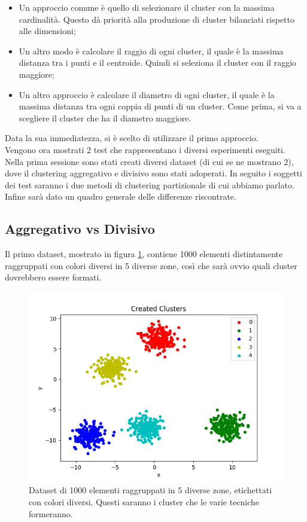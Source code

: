 \documentclass{llncs}
\newcommand{\acapo}{\vspace{0.5\baselineskip}\\}
\begin{document}
	\begin{itemize}
		\item Un approccio comune è quello di selezionare il cluster con la massima cardinalità. Questo dà priorità alla produzione di cluster bilanciati rispetto alle dimensioni;
	
		\item Un altro modo è calcolare il raggio di ogni cluster, il quale è la massima distanza tra i punti e il centroide. Quindi si seleziona il cluster con il raggio maggiore;
			
		\item Un altro approccio è calcolare il diametro di ogni cluster, il quale è la massima distanza tra ogni coppia di punti di un cluster.
			Come prima, si va a scegliere il cluster che ha il diametro maggiore.
	\end{itemize}
	
	Data la sua immediatezza, si è scelto di utilizzare il primo approccio.
	\acapo
	Vengono ora mostrati 2 test che rappresentano i diversi esperimenti eseguiti. Nella prima sessione sono stati creati diversi dataset (di cui se ne mostrano 2), dove il clustering 
	aggregativo e divisivo sono stati adoperati. In seguito i soggetti dei test saranno i due metodi di clustering partizionale di cui abbiamo parlato. Infine sarà dato un quadro
	generale delle differenze riscontrate.
	\clearpage
	\subsection{Aggregativo vs Divisivo}
	Il primo dataset, mostrato in figura \ref{c:5_c}, contiene 1000 elementi distintamente raggruppati con colori diversi in 5 diverse zone, così che sarà ovvio quali cluster dovrebbero essere formati.
	\begin{figure}[h]
		\centering
		\includegraphics[width=\linewidth]{immagini/5_clusters.png}
		\caption{Dataset di 1000 elementi raggruppati in 5 diverse zone, etichettati con colori diversi. Questi saranno i cluster che le varie tecniche formeranno.}
		\label{c:5_c}
	\end{figure}
\end{document}
